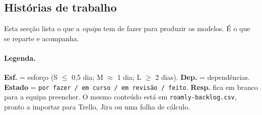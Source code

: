 \documentclass[11pt,a4paper]{article}
\begin{document}
\begin{landscape}
\section{Histórias de trabalho}

Esta secção lista o que a \emph{equipa} tem de fazer para produzir os modelos. É o que se reparte e acompanha.

\paragraph{Legenda.} \textbf{Esf.} = esforço (S $\le$ 0,5 dia; M $\approx$ 1 dia; L $\ge$ 2 dias). \textbf{Dep.} = dependências. \textbf{Estado} = \texttt{por fazer / em curso / em revisão / feito}. \textbf{Resp.} fica em branco para a equipa preencher. O mesmo conteúdo está em \texttt{roamly-backlog.csv}, pronto a importar para Trello, Jira ou uma folha de cálculo.


\end{landscape}
\end{document}
